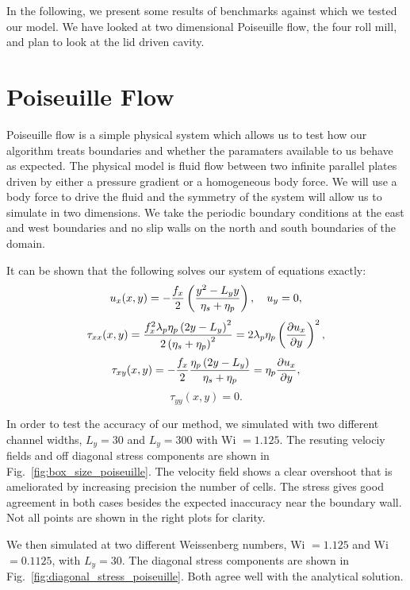 In the following, we present some results of benchmarks against which we tested our model. We have looked at two dimensional Poiseuille flow, the four roll mill, and plan to look at the lid driven cavity.

\section{Poiseuille Flow}
Poiseuille flow is a simple physical system which allows us to test how our algorithm treats boundaries and whether the paramaters available to us behave as expected. The physical model is fluid flow between two infinite parallel plates driven by either a pressure gradient or a homogeneous body force. We will use a body force to drive the fluid and the symmetry of the system will allow us to simulate in two dimensions. We take the periodic boundary conditions at the east and west boundaries and no slip walls on the north and south boundaries of the domain.

It can be shown that the following solves our system of equations exactly:
\begin{equation}
u_x(x,y) = -\frac{f_x}{2}\left( \frac{y^2 - L_y y}{\eta_s +\eta_p}\right), \quad u_y = 0,
\end{equation}
\begin{equation}
\tau_{xx}(x,y) = \frac{f^2_x \lambda_p \eta_p \left( 2y - L_y\right)^2}{2\left( \eta_s + \eta_p\right)^2} = 2\lambda_p\eta_p\left(\frac{\partial u_x}{\partial y}\right)^2,
\end{equation}
\begin{equation}
\tau_{xy}(x,y) = -\frac{f_x}{2} \frac{\eta_p\left( 2y-L_y\right)}{\eta_s+\eta_p} = \eta_p\frac{\partial u_x}{\partial y},
\end{equation}
\begin{equation}
\tau_{yy}(x,y) = 0.
\end{equation}

In order to test the accuracy of our method, we simulated with two different channel widths, $L_y = 30$ and $L_y = 300$ with Wi $= 1.125$. The resuting velociy fields and off diagonal stress components are shown in Fig.~\ref{fig:box_size_poiseuille}. The velocity field shows a clear overshoot that is ameliorated by increasing precision the number of cells. The stress gives good agreement in both cases besides the expected inaccuracy near the boundary wall. Not all points are shown in the right plots for clarity.

We then simulated at two different Weissenberg numbers, Wi $=1.125$ and Wi $=0.1125$, with $L_y = 30$. The diagonal stress components are shown in Fig.~\ref{fig:diagonal_stress_poiseuille}. Both agree well with the analytical solution.

